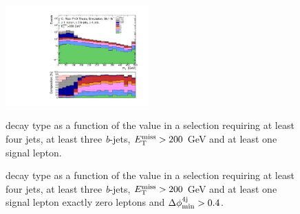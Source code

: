\begin{figure}[h!]
\centering 
\includegraphics[width=0.49\textwidth]{figures/Chap7/Rizzi-Fig7-3.pdf}
\caption{\ttbar decay type as a function of the \mt value  in a selection requiring at least four jets, at least three \textit{b}-jets, $E_{\rm T}^{\mathrm{miss}}>200$ GeV and at least one signal lepton.}\label{fig:ttbar_decay_mT_1L}

\caption{\ttbar decay type as a function of the \mtb value  in a selection requiring at least four jets, at least three \textit{b}-jets, $E_{\rm T}^{\mathrm{miss}}>200$ GeV and  at least one signal lepton  exactly zero leptons and $\Delta\phi_{\rm{min}}^{4{\rm{j}}} > 0.4$.}\label{fig:ttbar_decay_mTb_min}
\end{figure}

